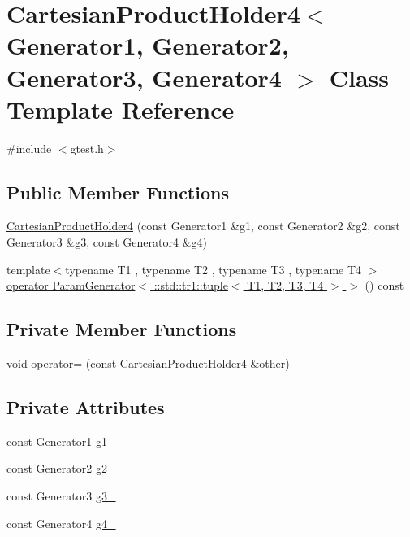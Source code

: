 \hypertarget{classtesting_1_1internal_1_1CartesianProductHolder4}{\section{\-Cartesian\-Product\-Holder4$<$ \-Generator1, \-Generator2, \-Generator3, \-Generator4 $>$ \-Class \-Template \-Reference}
\label{da/d86/classtesting_1_1internal_1_1CartesianProductHolder4}
}


{\ttfamily \#include $<$gtest.\-h$>$}

\subsection*{\-Public \-Member \-Functions}
\begin{DoxyCompactItemize}
\item 
\hyperlink{classtesting_1_1internal_1_1CartesianProductHolder4_a3754d475f9d7d9d9c09472ac7ff33aae}{\-Cartesian\-Product\-Holder4} (const \-Generator1 \&g1, const \-Generator2 \&g2, const \-Generator3 \&g3, const \-Generator4 \&g4)
\item 
{\footnotesize template$<$typename T1 , typename T2 , typename T3 , typename T4 $>$ }\\\hyperlink{classtesting_1_1internal_1_1CartesianProductHolder4_a590ef7db58729f2280da957f1859ca8f}{operator Param\-Generator$<$ \-::std\-::tr1\-::tuple$<$ T1, T2, T3, T4 $>$ $>$} () const 
\end{DoxyCompactItemize}
\subsection*{\-Private \-Member \-Functions}
\begin{DoxyCompactItemize}
\item 
void \hyperlink{classtesting_1_1internal_1_1CartesianProductHolder4_a8ebf70fccbc0a9858b112815e2dba570}{operator=} (const \hyperlink{classtesting_1_1internal_1_1CartesianProductHolder4}{\-Cartesian\-Product\-Holder4} \&other)
\end{DoxyCompactItemize}
\subsection*{\-Private \-Attributes}
\begin{DoxyCompactItemize}
\item 
const \-Generator1 \hyperlink{classtesting_1_1internal_1_1CartesianProductHolder4_a36a04c8f9e515291d6a093ab378084f7}{g1\-\_\-}
\item 
const \-Generator2 \hyperlink{classtesting_1_1internal_1_1CartesianProductHolder4_a6cfd9fa9a396d07747d5ebb1f05c7f22}{g2\-\_\-}
\item 
const \-Generator3 \hyperlink{classtesting_1_1internal_1_1CartesianProductHolder4_a79088ad1a5d8e0e316bd20057b9cfb3f}{g3\-\_\-}
\item 
const \-Generator4 \hyperlink{classtesting_1_1internal_1_1CartesianProductHolder4_afdb77af6126bc058715b1304ec0cc727}{g4\-\_\-}
\end{DoxyCompactItemize}


